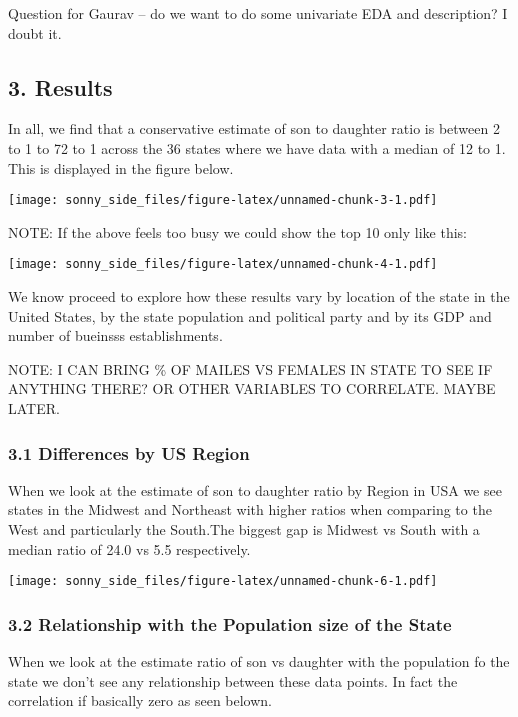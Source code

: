 \documentclass[]{article}
\begin{document}
Question for Gaurav -- do we want to do some univariate EDA and
description? I doubt it.

\hypertarget{results}{%
\subsection{3. Results}\label{results}}

In all, we find that a conservative estimate of son to daughter ratio is
between 2 to 1 to 72 to 1 across the 36 states where we have data with a
median of 12 to 1. This is displayed in the figure below.

\texttt{[image: sonny\_side\_files/figure-latex/unnamed-chunk-3-1.pdf]}

NOTE: If the above feels too busy we could show the top 10 only like
this:

\texttt{[image: sonny\_side\_files/figure-latex/unnamed-chunk-4-1.pdf]}

We know proceed to explore how these results vary by location of the
state in the United States, by the state population and political party
and by its GDP and number of bueinsss establishments.

NOTE: I CAN BRING \% OF MAILES VS FEMALES IN STATE TO SEE IF ANYTHING
THERE? OR OTHER VARIABLES TO CORRELATE. MAYBE LATER.

\hypertarget{differences-by-us-region}{%
\subsubsection{3.1 Differences by US
Region}\label{differences-by-us-region}}

When we look at the estimate of son to daughter ratio by Region in USA
we see states in the Midwest and Northeast with higher ratios when
comparing to the West and particularly the South.The biggest gap is
Midwest vs South with a median ratio of 24.0 vs 5.5 respectively.

\texttt{[image: sonny\_side\_files/figure-latex/unnamed-chunk-6-1.pdf]}

\hypertarget{relationship-with-the-population-size-of-the-state}{%
\subsubsection{3.2 Relationship with the Population size of the
State}\label{relationship-with-the-population-size-of-the-state}}

When we look at the estimate ratio of son vs daughter with the
population fo the state we don't see any relationship between these data
points. In fact the correlation if basically zero as seen belown.
\end{document}
